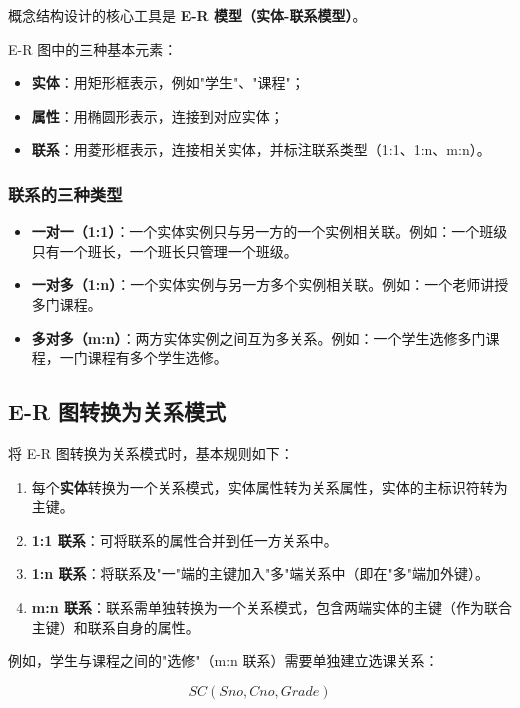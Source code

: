 \documentclass{../../note}
\begin{document}
概念结构设计的核心工具是 \textbf{E-R 模型（实体-联系模型）}。

E-R 图中的三种基本元素：

\begin{itemize}
  \item \textbf{实体}：用矩形框表示，例如"学生"、"课程"；
  \item \textbf{属性}：用椭圆形表示，连接到对应实体；
  \item \textbf{联系}：用菱形框表示，连接相关实体，并标注联系类型（1:1、1:n、m:n）。
\end{itemize}

\subsubsection{联系的三种类型}

\begin{itemize}
  \item \textbf{一对一（1:1）}：一个实体实例只与另一方的一个实例相关联。例如：一个班级只有一个班长，一个班长只管理一个班级。
  \item \textbf{一对多（1:n）}：一个实体实例与另一方多个实例相关联。例如：一个老师讲授多门课程。
  \item \textbf{多对多（m:n）}：两方实体实例之间互为多关系。例如：一个学生选修多门课程，一门课程有多个学生选修。
\end{itemize}

\subsection{E-R 图转换为关系模式}

将 E-R 图转换为关系模式时，基本规则如下：

\begin{enumerate}
  \item 每个\textbf{实体}转换为一个关系模式，实体属性转为关系属性，实体的主标识符转为主键。
  \item \textbf{1:1 联系}：可将联系的属性合并到任一方关系中。
  \item \textbf{1:n 联系}：将联系及"一"端的主键加入"多"端关系中（即在"多"端加外键）。
  \item \textbf{m:n 联系}：联系需单独转换为一个关系模式，包含两端实体的主键（作为联合主键）和联系自身的属性。
\end{enumerate}

例如，学生与课程之间的"选修"（m:n 联系）需要单独建立选课关系：

\[
SC(Sno, Cno, Grade)
\]
\end{document}
